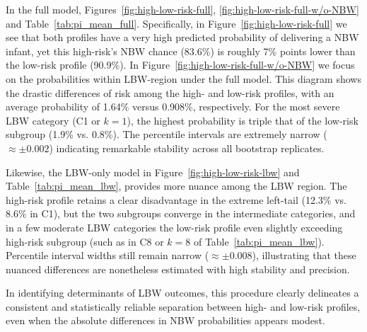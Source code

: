 In the full model, Figures~\ref{fig:high-low-risk-full}, \ref{fig:high-low-risk-full-w/o-NBW} and Table~\ref{tab:pi_mean_full}. Specifically, in Figure~\ref{fig:high-low-risk-full} we see that both profiles have a very high predicted probability of delivering a NBW infant, yet this high-risk’s NBW chance (83.6\%) is roughly 7\% points lower than the low-risk profile (90.9\%). In Figure~\ref{fig:high-low-risk-full-w/o-NBW} we focus on the probabilities within LBW-region under the full model. This diagram shows the drastic differences of risk among the high- and low-risk profiles, with an average probability of 1.64\% versus 0.908\%, respectively. For the most severe LBW category (C1 or \(k=1\)), the highest probability is triple that of the low-risk subgroup (1.9\% vs. 0.8\%). The percentile intervals are extremely narrow (\(\approx \pm 0.002\)) indicating remarkable stability across all bootstrap replicates. 

Likewise, the LBW-only model in Figure~\ref{fig:high-low-risk-lbw} and Table~\ref{tab:pi_mean_lbw}, provides more nuance among the LBW region. The high-risk profile retains a clear disadvantage in the extreme left-tail (12.3\% vs. 8.6\% in C1), but the two subgroups converge in the intermediate categories, and in a few moderate LBW categories the low-risk profile even slightly exceeding high-risk subgroup (such as in C8 or \(k=8\) of Table~\ref{tab:pi_mean_lbw}). Percentile interval widths still remain narrow (\(\approx \pm 0.008\)), illustrating that these nuanced differences are nonetheless estimated with high stability and precision. 

In identifying determinants of LBW outcomes, this procedure clearly delineates a consistent and statistically reliable separation between high- and low-risk profiles, even when the absolute differences in NBW probabilities appears modest.

\newpage

% 
% 